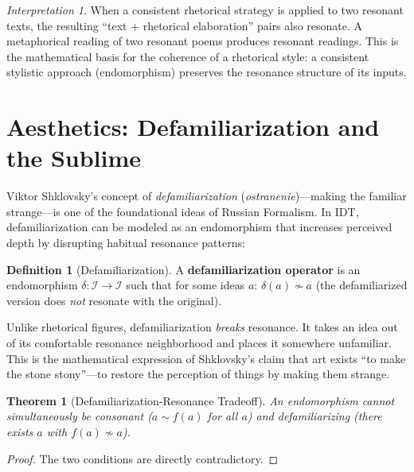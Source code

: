 \documentclass[11pt,openany]{book}
\theoremstyle{definition}
\newtheorem{definition}[axiom]{Definition}
\theoremstyle{plain}
\newtheorem{theorem}[axiom]{Theorem}
\theoremstyle{remark}
\newtheorem{interpretation}[axiom]{Interpretation}
\newcommand{\IS}{\mathcal{I}}               %
\newcommand{\res}{\sim}                      %
\begin{document}
\begin{interpretation}
When a consistent rhetorical strategy is applied to two resonant texts, the resulting ``text + rhetorical elaboration'' pairs also resonate. A metaphorical reading of two resonant poems produces resonant readings. This is the mathematical basis for the coherence of a rhetorical style: a consistent stylistic approach (endomorphism) preserves the resonance structure of its inputs.
\end{interpretation}

\section{Aesthetics: Defamiliarization and the Sublime}

Viktor Shklovsky's concept of \emph{defamiliarization} (\textit{ostranenie})---making the familiar strange---is one of the foundational ideas of Russian Formalism. In IDT, defamiliarization can be modeled as an endomorphism that increases perceived depth by disrupting habitual resonance patterns:

\begin{definition}[Defamiliarization]
A \textbf{defamiliarization operator} is an endomorphism $\delta : \IS \to \IS$ such that for some ideas $a$: $\delta(a) \not\res a$ (the defamiliarized version does \emph{not} resonate with the original).
\end{definition}

Unlike rhetorical figures, defamiliarization \emph{breaks} resonance. It takes an idea out of its comfortable resonance neighborhood and places it somewhere unfamiliar. This is the mathematical expression of Shklovsky's claim that art exists ``to make the stone stony''---to restore the perception of things by making them strange.

\begin{theorem}[Defamiliarization-Resonance Tradeoff]
An endomorphism cannot simultaneously be consonant ($a \res f(a)$ for all $a$) and defamiliarizing (there exists $a$ with $f(a) \not\res a$).
\end{theorem}

\begin{proof}
The two conditions are directly contradictory.
\end{proof}
\end{document}

